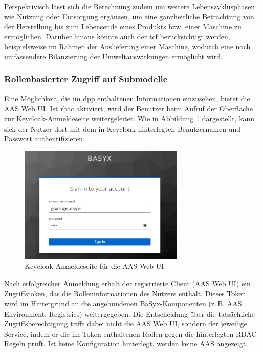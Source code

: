 Perspektivisch lässt sich die Berechnung zudem um weitere Lebenszyklusphasen wie Nutzung oder Entsorgung ergänzen, um eine ganzheitliche Betrachtung von der Herstellung bis zum Lebensende eines Produkts bzw. einer Maschine zu ermöglichen.
Darüber hinaus könnte auch der \acs{tcf} berücksichtigt werden, beispielsweise im Rahmen der Auslieferung einer Maschine, wodurch eine noch umfassendere Bilanzierung der Umweltauswirkungen ermöglicht wird.

\subsubsection{Rollenbasierter Zugriff auf Submodelle}
Eine Möglichkeit, die im \acs{dpp} enthaltenen Informationen einzusehen, bietet die AAS Web UI. 
Ist \acs{rbac} aktiviert, wird der Benutzer beim Aufruf der Oberfläche zur Keycloak-Anmeldeseite weitergeleitet. 
Wie in Abbildung \ref{fig:KeycloakAnmeldeSeite} dargestellt, kann sich der Nutzer dort mit dem in Keycloak hinterlegten Benutzernamen und Passwort authentifizieren.

\begin{figure}[htbp]
    \centering
        \includegraphics[width=0.7\textwidth]{Bilder/Ergebnisse/DPP/KeycloakAnmeldeSeite.png}
    \caption{Keycloak-Anmeldeseite für die AAS Web UI}
    \label{fig:KeycloakAnmeldeSeite}
\end{figure}

Nach erfolgreicher Anmeldung erhält der registrierte Client (AAS Web UI) ein Zugriffstoken, das die Rolleninformationen des Nutzers enthält.  
Dieses Token wird im Hintergrund an die angebundenen BaSyx-Komponenten (z.\,B. AAS Environment, Registries) weitergegeben.  
Die Entscheidung über die tatsächliche Zugriffsberechtigung trifft dabei nicht die AAS Web UI, sondern der jeweilige Service, indem er die im Token enthaltenen Rollen gegen die hinterlegten RBAC-Regeln prüft.
Ist keine Konfiguration hinterlegt, werden keine AAS angezeigt.


